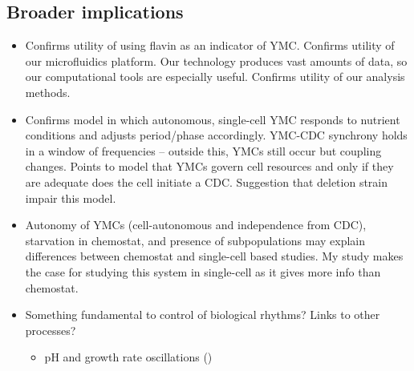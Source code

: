 \subsection{Broader implications}
\label{sec:biology-discussion-implications}

\begin{itemize}
\item Confirms utility of using flavin as an indicator of YMC.  Confirms utility of our microfluidics platform.  Our technology produces vast amounts of data, so our computational tools are especially useful.  Confirms utility of our analysis methods.
\item Confirms model in which autonomous, single-cell YMC responds to nutrient conditions and adjusts period/phase accordingly.  YMC-CDC synchrony holds in a window of frequencies -- outside this, YMCs still occur but coupling changes.  Points to model that YMCs govern cell resources and only if they are adequate does the cell initiate a CDC.  Suggestion that deletion strain impair this model.
\item Autonomy of YMCs (cell-autonomous and independence from CDC), starvation in chemostat, and presence of subpopulations may explain differences between chemostat and single-cell based studies.  My study makes the case for studying this system in single-cell as it gives more info than chemostat.
\item Something fundamental to control of biological rhythms?  Links to other processes?
\begin{itemize}
\item pH and growth rate oscillations (\textcite{luziaPHDependenciesGlycolytic})
\end{itemize}
\end{itemize}
